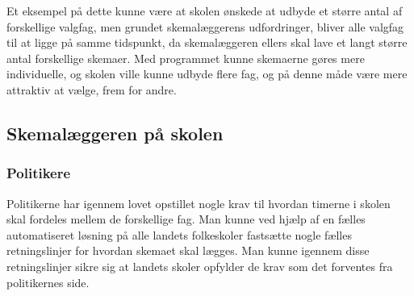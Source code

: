 Et eksempel på dette kunne være at skolen ønskede at udbyde et større antal af forskellige valgfag, men grundet skemalæggerens udfordringer, bliver alle valgfag til at ligge på samme tidspunkt, da skemalæggeren ellers skal lave et langt større antal forskellige skemaer. Med programmet kunne skemaerne gøres mere individuelle, og skolen ville kunne udbyde flere fag, og på denne måde være mere attraktiv at vælge, frem for andre.

\subsection{Skemalæggeren på skolen}



\subsubsection{Politikere}
Politikerne har igennem lovet opstillet nogle krav til hvordan timerne i skolen skal fordeles mellem de forskellige fag. Man kunne ved hjælp af en fælles automatiseret løsning på alle landets folkeskoler fastsætte nogle fælles retningslinjer for hvordan skemaet skal lægges. Man kunne igennem disse retningslinjer sikre sig at landets skoler opfylder de krav som det forventes fra politikernes side. 

\iffalse
I stedet for at en person ville skulle påtage sig opgaven at få dette nye puslespil til at gå op, er det blot få ting der skal ændres i et program, og et nyt skema vil være klart med det samme. Altså er man ikke længere afhængig af at en person skal kunne få de mange klasser og lærere til at spille sammen, men at et program kan finde frem til løsningen langt hurtigere. 

Når der udbydes valgfag i folkeskolen, foregår dette ofte ved at prioritere en række fag, hvorefter skemalæggeren efter bedste evne kan forsøge at finde lærere til at undervise i disse fag. Der bliver derfor lagt et tidspunkt ind i skemaet der blot hedder ``valgfag'', hvor eleverne så kan gå til deres respektive valgfag. Det er ikke sikkert at det er muligt at alle kommer på de valghold de havde som første prioritet, da skemaerne simpelthen kan blive umulige at få til at gå op. En automatiseret løsning vil dog ikke have disse samme begrænsninger. Den store forskel mellem et menneske og en computer i denne sammenhæng er nemlig, at mens en menneskelig skemalægger kan få skemaerne til at gå op med 10 forskellige klassetrin, kan en computer få det til at gå op med små variationer i skemaet til den enkelte elevtype (elevtype skal her forstås som en unik sammensætning af påkrævede og valgfrie fag). Der er derfor intet der stopper programmet fra at lægge nogle elevers valgfag mandag eftermiddag, mens de for andre elever i samme klasse først har valgfag torsdag morgen.

Ved hjælp af en automatiseret løsning, som derfor løser udfordringerne ved denne personlige skemalægning, opnår skolen altså både en økonomisk fordel og et større fagligt udbud til eleverne.
\fi